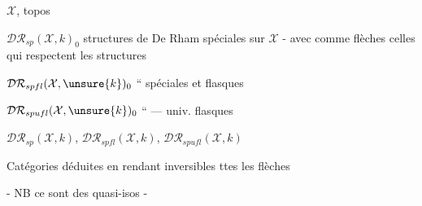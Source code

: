 $\mathcal X$, topos

$\mathcal{DR}_{sp}(\mathcal X,k)_0$ structures de De Rham spéciales sur $\mathcal X$ - avec comme flèches celles qui respectent  les structures 

$\mathcal{DR}_{spfl}(\mathcal X,\unsure{k})_0$ \quad `` \quad spéciales et flasques

$\mathcal{DR}_{spufl}(\mathcal X,\unsure{k})_0$ \quad `` \quad --- univ. flasques

$\mathcal{DR}_{sp}(\mathcal X,k)$, $\mathcal{DR}_{spfl}(\mathcal X,k)$, $\mathcal{DR}_{spufl}(\mathcal X,k)$

Catégories  déduites en rendant inversibles ttes les flèches

- NB ce sont des quasi-isos -

